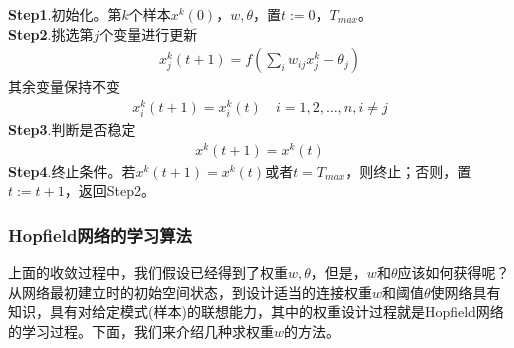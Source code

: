{            \textbf{Step1}.初始化。第$k$个样本$x^k(0)$，$w,\theta$，置$t:=0$，$T_{max}$。\\
            \textbf{Step2}.挑选第$j$个变量进行更新
            \begin{align*}
            x_j^k(t+1) = f \left( \sum_iw_{ij}x^k_j -\theta_j \right)
            \end{align*}
            其余变量保持不变
            \begin{align*}
            x_i^k(t+1) = x_i^k(t) \quad i = 1,2,\dots,n,i\neq j
            \end{align*}
            \textbf{Step3}.判断是否稳定
            \begin{align*}
            x^k(t+1) = x^k(t)
            \end{align*}
            \textbf{Step4}.终止条件。若$x^k(t+1) = x^k(t)$或者$t = T_{max}$，则终止；否则，置$t:= t+1$，返回Step2。
        \subsubsection{Hopfield网络的学习算法}
            \par
            上面的收敛过程中，我们假设已经得到了权重$w,\theta$，但是，$w$和$\theta$应该如何获得呢？从网络最初建立时的初始空间状态，到设计适当的连接权重$w$和阈值$\theta$使网络具有知识，具有对给定模式(样本)的联想能力，其中的权重设计过程就是Hopfield网络的学习过程。下面，我们来介绍几种求权重$w$的方法。
}
